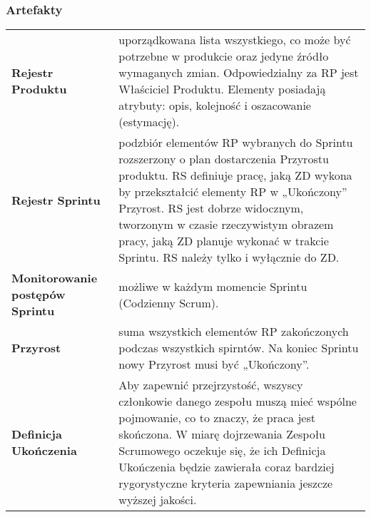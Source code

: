 \documentclass[a4paper]{article}
\begin{document}
    \subsubsection{Artefakty}
    \begin{table}[H]
        \begin{center}
            \begin{tabular}{ p{} p{} }
                \textbf{Rejestr Produktu}
                &
                uporządkowana lista wszystkiego,
                co może być potrzebne w produkcie oraz jedyne źródło wymaganych zmian.
                Odpowiedzialny za RP jest Właściciel Produktu.
                Elementy posiadają atrybuty: opis, kolejność i oszacowanie (estymację).
                \\

                \cmidrule(r){1-1}\cmidrule(l){2-2}
                \textbf{Rejestr Sprintu}
                &
                podzbiór elementów RP wybranych do Sprintu rozszerzony o plan
                dostarczenia Przyrostu produktu.
                RS definiuje pracę, jaką ZD wykona by przekształcić elementy
                RP w „Ukończony” Przyrost.
                RS jest dobrze widocznym, tworzonym w czasie rzeczywistym obrazem pracy, jaką ZD planuje wykonać w trakcie Sprintu.
                RS należy tylko i wyłącznie do ZD.
                \\

                \cmidrule(r){1-1}\cmidrule(l){2-2}
                \textbf{Monitorowanie postępów Sprintu}
                &
                możliwe w każdym momencie Sprintu (Codzienny Scrum).
                \\

                \cmidrule(r){1-1}\cmidrule(l){2-2}
                \textbf{Przyrost}
                &
                suma wszystkich elementów RP zakończonych podczas wszystkich spirntów.
                Na koniec Sprintu nowy Przyrost musi być „Ukończony”.
                \\

                \cmidrule(r){1-1}\cmidrule(l){2-2}
                \textbf{Definicja Ukończenia}
                &
                Aby zapewnić przejrzystość, wszyscy członkowie danego zespołu muszą mieć wspólne
                pojmowanie, co to znaczy, że praca jest skończona. W miarę dojrzewania Zespołu Scrumowego oczekuje się, że ich Definicja Ukończenia będzie
                zawierała coraz bardziej rygorystyczne kryteria zapewniania jeszcze wyższej jakości.
                \\
            \end{tabular}
        \end{center}
    \end{table}
\end{document}
